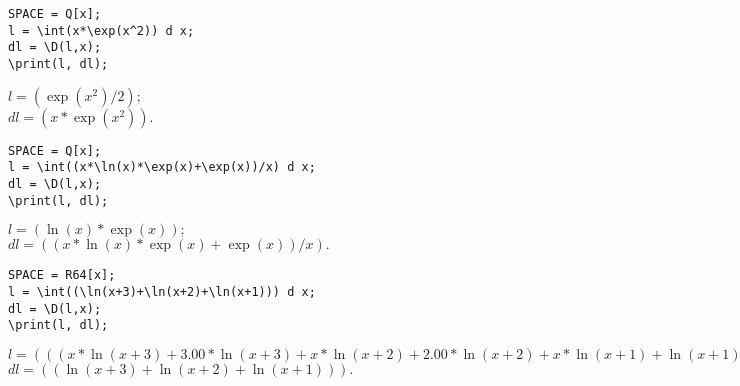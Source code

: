 \begin{verbatim}
SPACE = Q[x];
l = \int(x*\exp(x^2)) d x;
dl = \D(l,x);
\print(l, dl);
\end{verbatim}
\vspace*{-3mm}

{
$l = (\exp(x^2)/2); $\\
\hspace*{4mm} $dl = (x*\exp(x^2)). $
}

\begin{verbatim}
SPACE = Q[x];
l = \int((x*\ln(x)*\exp(x)+\exp(x))/x) d x;
dl = \D(l,x);
\print(l, dl);
\end{verbatim}
\vspace*{-3mm}

{
$l = (\ln(x)*\exp(x)); $\\
\hspace*{4mm} $dl = ((x*\ln(x)*\exp(x)+\exp(x))/x). $
}


\begin{verbatim}
SPACE = R64[x];
l = \int((\ln(x+3)+\ln(x+2)+\ln(x+1))) d x;
dl = \D(l,x);
\print(l, dl);
\end{verbatim}
\vspace*{-3mm}

{
$l = (((x*\ln(x+3)+3.00*\ln(x+3)+x*\ln(x+2)+2.00*\ln(x+2)+x*\ln(x+1)+\ln(x+1))-3x)); $\\
\hspace*{4mm} $dl = ((\ln(x+3)+\ln(x+2)+\ln(x+1))). $
}

